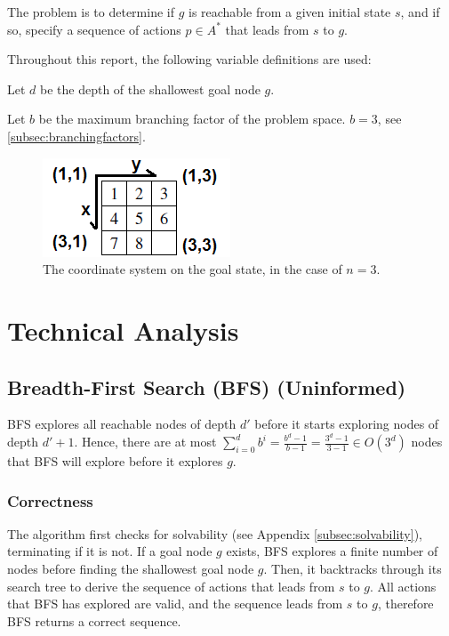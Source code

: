 \documentclass[runningheads]{llncs}
\begin{document}
The problem is to determine if $g$ is reachable from a given initial state $s$, and if so, specify a sequence of actions $p \in A^\ast$ that leads from $s$ to $g$.

Throughout this report, the following variable definitions are used:

Let $d$ be the depth of the shallowest goal node $g$.

Let $b$ be the maximum branching factor of the problem space. $b = 3$, see \ref{subsec:branchingfactors}.

\begin{figure}
	\centering
	\includegraphics{coord_system.png}
	\caption{The coordinate system on the goal state, in the case of $n=3$.} \label{fig:coordsystem}
\end{figure}



\section{Technical Analysis}

\subsection{Breadth-First Search (BFS) (Uninformed)}

BFS explores all reachable nodes of depth $d'$ before it starts exploring nodes of depth $d'+1$. Hence, there are at most $\sum_{i=0}^d b^i = \frac{b^d-1}{b-1} = \frac{3^d-1}{3-1} \in O(3^d)$ nodes that BFS will explore before it explores $g$.

\subsubsection{Correctness}
The algorithm first checks for solvability (see Appendix \ref{subsec:solvability}), terminating if it is not. If a goal node $g$ exists, BFS explores a finite number of nodes before finding the shallowest goal node $g$. Then, it backtracks through its search tree to derive the sequence of actions that leads from $s$ to $g$. All actions that BFS has explored are valid, and the sequence leads from $s$ to $g$, therefore BFS returns a correct sequence.
\end{document}
